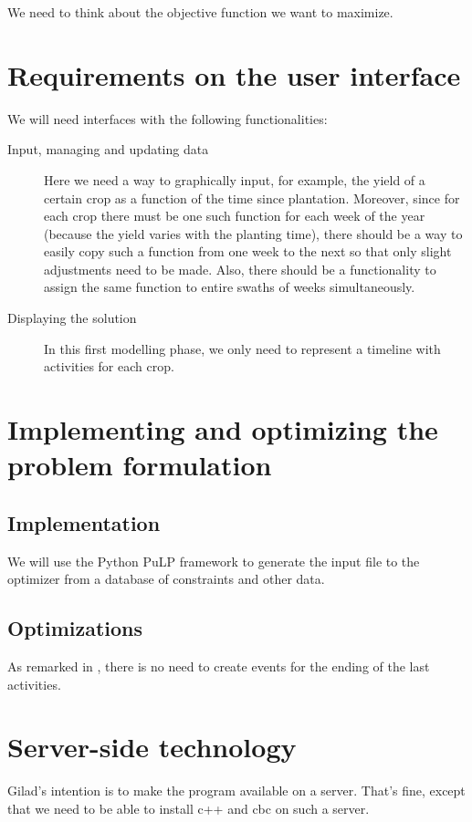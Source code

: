 \documentclass[11pt,reqno]{amsart}
\numberwithin{equation}{section}
\begin{document}
We need to think about the objective function we want to  maximize.


\section{Requirements on the user interface}

We will need interfaces with the following functionalities:

\begin{description}
\item[Input, managing and updating data] Here we need a way to graphically input, for
  example, the yield of a certain crop as a function of the time since
  plantation. Moreover, since for each crop there must be one such function for each week
  of the year (because the yield varies with the planting time), there should be a way to
  easily copy such a function from one week to the next so that only slight adjustments
  need to be made. Also, there should be a functionality to assign the same function to
  entire swaths of weeks simultaneously. 

\item[Displaying the solution] In this first modelling phase, we only need to represent a
  timeline with activities for each crop. 
\end{description}


\section{Implementing and optimizing the problem formulation}

\subsection{Implementation}

We will use the Python PuLP framework to generate the input file to the optimizer from
a database of constraints and other data.

\subsection{Optimizations}
As remarked in \cite{artigues-etal11}, there is no need to create
events for the ending of the last activities. 

\section{Server-side technology}

Gilad's intention is to make the program available on a server. That's
fine, except that we need to be able to install c++ and cbc on such a server.



\end{document}

